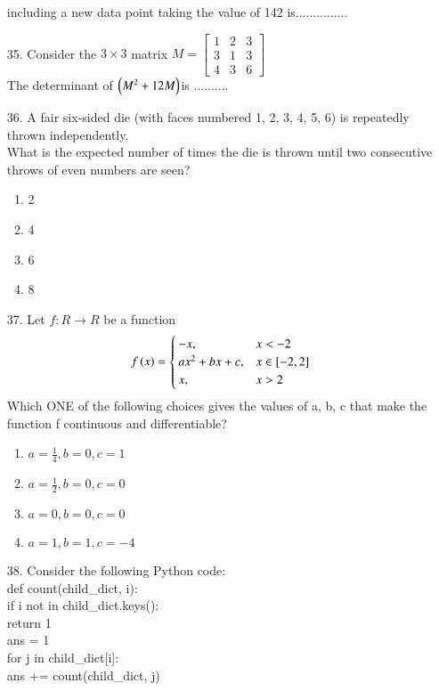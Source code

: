 \documentclass[journal]{IEEEtran}
\begin{document}
\begin{enumerate}
    including a new data point taking the value of 142 is............... 
    \item[35.] Consider the $3\times 3$ matrix $M = \begin{bmatrix}1&2&3\\3&1&3\\4&3&6\end{bmatrix}$ \\ The determinant of $\left(M^2 + 12M\right) $is .......... 
    \item[36.] A fair six-sided die (with faces numbered 1, 2, 3, 4, 5, 6) is repeatedly thrown
    independently.\\
    What is the expected number of times the die is thrown until two consecutive throws
    of even numbers are seen?
    \begin{enumerate}[label = (\Alph*)]
        \item 2
        \item 4
        \item 6
        \item 8
    \end{enumerate}
    \item[37.] Let $f: R\to R$ be a function $$f\left(x\right) = \begin{cases} -x, & x<-2\\ax^2 + bx + c, &x\in [-2,2]\\ x,& x>2\end{cases}$$ 
    Which ONE of the following choices gives the values of a, b, c that make the
    function f continuous and differentiable?
    \begin{enumerate}[label = (\Alph*)]
        \item $a=\frac{1}{4}, b = 0, c=1$
        \item $a=\frac{1}{2}, b = 0, c=0$
        \item $a=0, b = 0, c=0$
        \item $a=1, b = 1, c=-4$
    \end{enumerate}
    \item[38.] Consider the following Python code:\\
    def count(child\_dict, i):\\
     if i not in child\_dict.keys():\\
     return 1\\
     ans = 1\\
     for j in child\_dict[i]:\\
     ans += count(child\_dict, j)\\

\end{enumerate}
\end{document}
